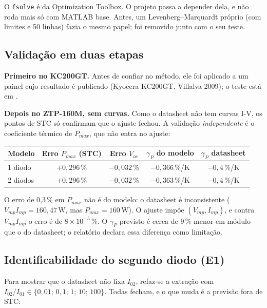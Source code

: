 \begin{resumo}
O \texttt{fsolve} \'e da Optimization Toolbox. O projeto passa a depender dela, e n\~ao roda mais s\'o com MATLAB base. Antes, um Levenberg--Marquardt pr\'oprio (com limites e
50 linhas) fazia o mesmo papel; foi removido junto com o seu teste.
\end{resumo}

\subsection{Valida\c{c}\~ao em duas etapas}

\textbf{Primeiro no KC200GT.} Antes de confiar no m\'etodo, ele foi aplicado a um painel cujo
resultado \'e publicado (Kyocera KC200GT, Villalva 2009); o teste est\'a em
.

\textbf{Depois no ZTP-160M, sem curvas.} Como o datasheet n\~ao tem curvas I-V, os pontos de STC
s\'o confirmam que o ajuste fechou. A valida\c{c}\~ao \emph{independente} \'e o coeficiente
t\'ermico de $P_{max}$, que n\~ao entra no ajuste:

\begin{resultado}
\small\centering
\begin{tabular}{@{}lcccc@{}}
\toprule
Modelo & Erro $P_{max}$ (STC) & Erro $V_{oc}$ & $\gamma_P$ do modelo & $\gamma_P$ datasheet \\ \midrule
1 diodo & $+0{,}296$\,\% & $-0{,}032$\,\% & $-0{,}366$\,\%/K & $-0{,}4$\,\%/K \\
2 diodos & $+0{,}296$\,\% & $-0{,}032$\,\% & $-0{,}363$\,\%/K & $-0{,}4$\,\%/K \\
\bottomrule
\end{tabular}
\end{resultado}

O erro de 0,3\,\% em $P_{max}$ n\~ao \'e do modelo: o datasheet \'e inconsistente
($V_{mp}I_{mp}=160{,}47$\,W, mas $P_{max}=160$\,W). O ajuste imp\~oe $(V_{mp},I_{mp})$, e contra
$V_{mp}I_{mp}$ o erro \'e de $8\times10^{-5}$\,\%. O $\gamma_P$ previsto \'e cerca de 9\,\% menor em
m\'odulo que o do datasheet; o relat\'orio declara essa diferen\c{c}a como limita\c{c}\~ao.

\subsection{Identificabilidade do segundo diodo (E1)}

Para mostrar que o datasheet n\~ao fixa $I_{02}$, refaz-se a extra\c{c}\~ao com $I_{02}/I_{01}\in\{0{,}01;\,0{,}1;\,1;\,10;\,100\}$.
Todas fecham, e o que muda \'e a previs\~ao fora de STC:

